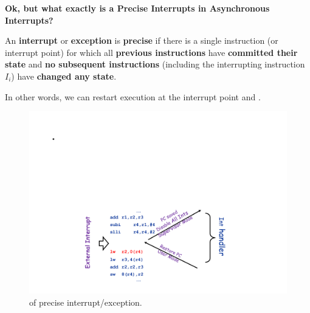 \begin{flushleft}
    \textcolor{Green4}{ \textbf{Ok, but what exactly is a Precise Interrupts in Asynchronous Interrupts?}}
\end{flushleft} 
An \textbf{interrupt} or \textbf{exception} is \textbf{precise} if there is a single instruction (or interrupt point) for which all \textbf{previous instructions} have \textbf{committed their state} and \textbf{no subsequent instructions} (including the interrupting instruction $I_{i}$) have \textbf{changed any state}.

\highspace
In other words, we can restart execution at the interrupt point and .

\begin{figure}[!htp]
    \centering
    \includegraphics[width=.8\textwidth]{img/precise-interrupts-1.pdf}
    \caption{ of precise interrupt/exception.}
\end{figure}